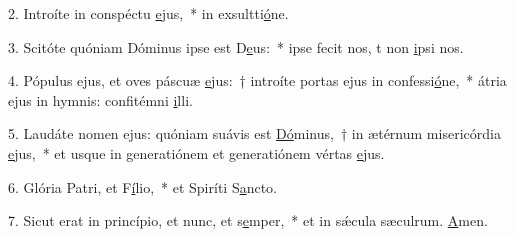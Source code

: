 2. Introíte in conspéctu \uline{e}jus,~* in exsultti\uline{ó}ne.\par 
3. Scitóte quóniam Dóminus ipse est D\uline{e}us:~* ipse fecit nos, t non \uline{i}psi nos.\par 
4. Pópulus ejus, et oves páscuæ \uline{e}jus:~† introíte portas ejus in confessi\uline{ó}ne,~* átria ejus in hymnis: confitémni \uline{i}lli.\par 
5. Laudáte nomen ejus: quóniam suávis est \uline{Dó}minus,~† in ætérnum misericórdia \uline{e}jus,~* et usque in generatiónem et generatiónem vértas \uline{e}jus.\par 
6. Glória Patri, et F\uline{í}lio,~* et Spiríti S\uline{a}ncto.\par 
7. Sicut erat in princípio, et nunc, et s\uline{e}mper,~* et in sǽcula sæculrum. \uline{A}men.\par 
